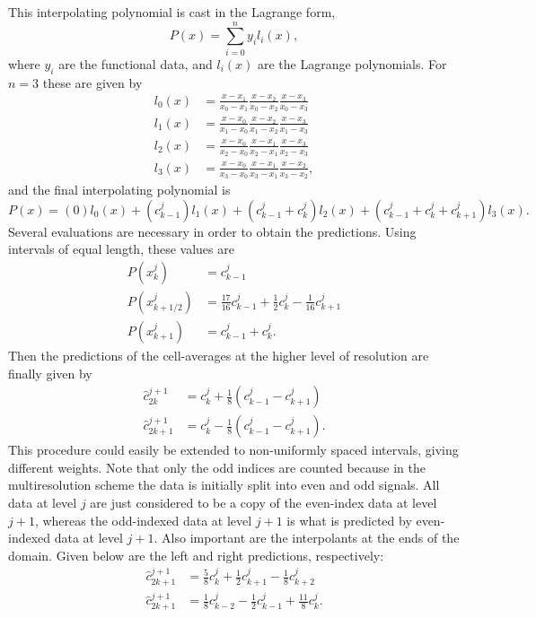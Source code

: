 \documentclass[12pt,letterpaper]{article}
\begin{document}
    This interpolating polynomial is cast in the Lagrange form,
    \begin{equation}
    P(x) = \sum_{i=0}^{n} y_{i} l_{i}(x),
    \end{equation}
    where $y_{i}$ are the functional data, and $l_{i}(x)$ are the Lagrange polynomials. For $n=3$ these
    are given by
    \begin{align}
        l_{0}(x) &= \frac{x-x_1}{x_0-x_1} \frac{x-x_2}{x_0-x_2} \frac{x-x_3}{x_0-x_3} \\
        l_{1}(x) &= \frac{x-x_0}{x_1-x_0} \frac{x-x_2}{x_1-x_2} \frac{x-x_3}{x_1-x_3} \\
        l_{2}(x) &= \frac{x-x_0}{x_2-x_0} \frac{x-x_1}{x_2-x_1} \frac{x-x_3}{x_2-x_3} \\
        l_{3}(x) &= \frac{x-x_0}{x_3-x_0} \frac{x-x_1}{x_3-x_1} \frac{x-x_2}{x_3-x_2},
    \end{align}
    and the final interpolating polynomial is
    \begin{equation}
        P(x) = (0) l_{0}(x) + ( c^{j}_{k-1} ) l_{1}(x) + ( c^{j}_{k-1} + c^{j}_{k} ) l_{2}(x)
            + ( c^{j}_{k-1} + c^{j}_{k} + c^{j}_{k+1} ) l_{3}(x).
    \end{equation}
    Several evaluations are necessary in order to obtain the predictions. Using intervals of equal length, these values are
    \begin{align}
        P(x^{j}_{k}) &= c^{j}_{k-1} \\
        P(x^{j}_{k+1/2}) &= \frac{17}{16} c^{j}_{k-1} + \frac{1}{2} c^{j}_{k} - \frac{1}{16} c^{j}_{k+1} \\
        P(x^{j}_{k+1}) &= c^{j}_{k-1} + c^{j}_{k}.
    \end{align}
    Then the predictions of the cell-averages at the higher level of resolution are finally given by
    \begin{align}
        \hat{c}^{j+1}_{2k} & = c^{j}_{k} + \frac{1}{8} \left( c^{j}_{k-1} - c^{j}_{k+1} \right) \\
        \hat{c}^{j+1}_{2k+1} & = c^{j}_{k} - \frac{1}{8} \left( c^{j}_{k-1} - c^{j}_{k+1} \right).
    \end{align}
    This procedure could easily be extended to non-uniformly
    spaced intervals, giving different weights. Note that only the
    odd indices are counted because in the multiresolution scheme the
    data is initially split into even
    and odd signals. All data at level $j$ are just considered to
    be a copy of the even-index data at level $j+1$, whereas
    the odd-indexed data at level $j+1$ is what is predicted
    by even-indexed data at level $j+1$. Also important are the
    interpolants at the ends of the domain. Given below are the
    left and right predictions, respectively:
    \begin{align}
        \hat{c}^{j+1}_{2k+1} & = \frac{5}{8} c^{j}_{k}
        + \frac{1}{2} c^{j}_{k+1} - \frac{1}{8} c^{j}_{k+2} \\
        \hat{c}^{j+1}_{2k+1} & = \frac{1}{8} c^{j}_{k-2}
        - \frac{1}{2} c^{j}_{k-1} + \frac{11}{8} c^{j}_{k}.
    \end{align}

  

\end{document}
